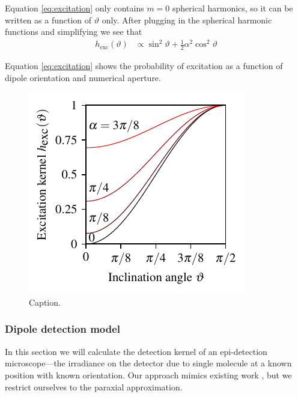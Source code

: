 \documentclass{osa-article}
\begin{document}
Equation \ref{eq:excitation} only contains $m = 0$ spherical harmonics, so it
can be written as a function of $\vartheta$ only. After plugging in the
spherical harmonic functions and simplifying we see that 
\begin{align}
  h_{\text{exc}}(\vartheta) &\propto \sin^2\vartheta + \frac{1}{2}\alpha^2\cos^2\vartheta \label{eq:hexctheta}
\end{align}


Equation \ref{eq:excitation} shows the probability of excitation as a function
of dipole orientation and numerical aperture.
\begin{figure}[h]
 \centering
   \centering
   \includegraphics[scale=0.95]{../figures/excitation/excitation.pdf}
   \caption{Caption.}
   \label{fig:microscope}
 \end{figure}


\subsubsection{Dipole detection model}
In this section we will calculate the detection kernel of an epi-detection
microscope---the irradiance on the detector due to single molecule at a known
position with known orientation. Our approach mimics existing work
\cite{backer2014, nov2006, agrawal2012}, but we restrict ourselves to the
paraxial approximation.
\end{document}
